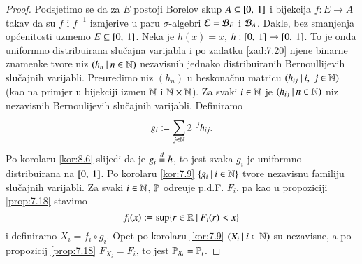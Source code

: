 \begin{proof}
    Podsjetimo se da za $E$ postoji Borelov skup $A \subseteq [{0}, \:{1}]$ i bijekcija $f : E \to A$ takav da su $f$ i $f^{-1}$ izmjerive u paru $\sigma$-algebri $\mathcal{E} =  \mathcal{B}_{E}$ i $\mathcal{B}_{A}$.
    Dakle, bez smanjenja op\' cenitosti uzmemo $E \subseteq [{0}, \:{1}]$. Neka je $h(x) = x$, $h: [{0}, \:{1}] \to [{0}, \:{1}]$.
    To je onda uniformno distribuirana slu\v cajna varijabla i po zadatku \ref{zad:7.20} njene binarne znamenke tvore niz $({h_n} \: | \: {n \in \mathbb{N}})$ nezavisnih jednako distribuiranih Bernoullijevih slu\v cajnih varijabli.
    Preuredimo niz $(h_n)$ u beskona\v cnu matricu $({h_{ij}} \: | \: {i, \; j \in \mathbb{N}})$ (kao na primjer u bijekciji izme\dj u $\mathbb{N}$ i $\mathbb{N} \times \mathbb{N}$).
    Za svaki $i \in \mathbb{N}$ je $({h_{ij}} \: | \: {n \in \mathbb{N}})$ niz nezavisnih Bernoulijevih slu\v cajnih varijabli.
    Definiramo
    \begin{equation*}
        g_i := \sum\limits_{j \in \mathbb{N}}^{} 2^{-j} h_{ij}.
    \end{equation*}
    Po korolaru \ref{kor:8.6} slijedi da je $g_i \overset{d}{=} h$, to jest svaka $g_i$ je uniformno distribuirana na $[{0}, \:{1}]$.
    Po korolaru \ref{kor:7.9} $\{{g_i} \: | \: {i \in \mathbb{N}}\}$ tvore nezavisnu familiju slu\v cajnih varijabli.
    Za svaki $i \in \mathbb{N}$, $\mathbb{P}$ odre\dj uje p.d.F. $F_i$, pa kao u propoziciji \ref{prop:7.18} stavimo
    \begin{equation*}
        f_i (x) := \sup \{{r \in \mathbb{R}} \: | \: {F_i (r) < x}\}
    \end{equation*}
    i definiramo $X_i = f_i \circ g_i$.
    Opet po korolaru \ref{kor:7.9} $({X_i} \: | \: {i \in \mathbb{N}})$ su nezavisne, a po propozicij \ref{prop:7.18} $F_{X_i} = F_i$, to jest $\mathbb{P}_{X_i} = \mathbb{P}_i$.
\end{proof}